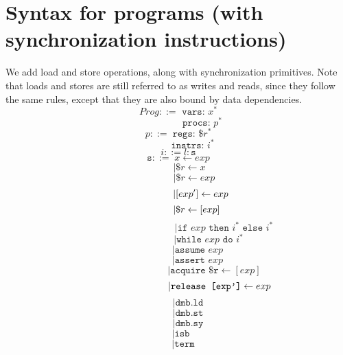 \documentclass{article}
\begin{document}
\section{Syntax for programs (with synchronization instructions)}
We add load and store operations, along with synchronization primitives. Note that loads and stores are still referred to as writes and reads, since they follow the same rules, except that they are also bound by data dependencies.
\vspace{-1em}
$$Prog ::= \texttt{ vars: }x^*$$
\vspace{-2em}
$$\qquad\qquad\quad\texttt{procs: }p^*$$
$$p ::= \;\texttt{regs: } \$r^*$$
\vspace{-2em}
$$\qquad\quad\texttt{instrs: }i^*$$
$$i ::= l:\texttt{s}$$
$$\texttt{s} ::= \;x \leftarrow exp$$ 
\vspace{-1.7em}
$$\qquad\;| \$r \leftarrow x $$
\vspace{-1.7em}
$$\qquad\quad\;| \$r \leftarrow exp$$
\vspace{-1.7em}
$$\qquad\qquad\kern 0.7em| [exp'] \leftarrow exp $$
\vspace{-1.7em}
$$\qquad\kern 1.9em| \$r \leftarrow [exp] $$
\vspace{-1.7em}
$$\qquad\qquad\qquad\qquad\quad\enspace|\texttt{if } exp \texttt{ then }i^* \texttt{ else }i^*$$
\vspace{-1.7em}
$$\qquad\qquad\qquad\;|\texttt{while } exp \texttt{ do }i^*$$
\vspace{-1.7em}
$$\qquad\qquad|\texttt{assume } exp$$
\vspace{-1.7em}
$$\qquad\qquad|\texttt{assert } exp$$
\vspace{-1.7em}
$$\qquad\qquad\qquad\quad\enspace|\texttt{acquire \$r} \leftarrow [exp] $$
\vspace{-1.7em}
$$\qquad\qquad\qquad\kern 2.6em |\texttt{release [exp']} \leftarrow exp$$
\vspace{-1.7em}
$$\qquad|\texttt{dmb.ld}$$
\vspace{-1.7em}
$$\qquad|\texttt{dmb.st}$$
\vspace{-1.7em}
$$\qquad|\texttt{dmb.sy}$$
\vspace{-1.7em}
$$\enspace|\texttt{isb}$$
\vspace{-1.7em}
$$\quad|\texttt{term}$$
\vspace{-3em}
\end{document}
